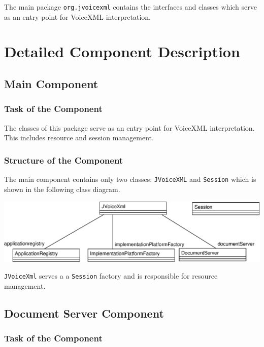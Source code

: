 \documentclass[11pt,a4paper]{article}
\begin{document}
The main package \texttt{org.jvoicexml} contains the interfaces and classes
which serve as an entry point for VoiceXML interpretation.

\section{Detailed Component Description}
\label{sec:deta-comp-descr}

\subsection{Main Component}
\label{sec:main-component}

\subsubsection{Task of the Component}

The classes of this package serve as an entry point for VoiceXML
interpretation. This includes resource and session management.

\subsubsection{Structure of the Component}

The main component contains only two classes: \texttt{JVoiceXML} and 
\texttt{Session} which is shown in the following class diagram.

\begin{center}
\includegraphics[scale=0.6]{class-main.eps}
\end{center}

\texttt{JVoiceXml} serves a a \texttt{Session} factory and is responsible
for resource management. 

\subsection{Document Server Component}
\label{sec:docum-serv-comp}

\subsubsection{Task of the Component}
\end{document}
